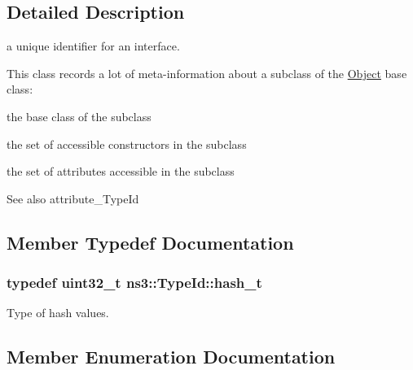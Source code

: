 \subsection{Detailed Description}
a unique identifier for an interface. 

This class records a lot of meta-\/information about a subclass of the \hyperlink{classns3_1_1Object}{Object} base class\+:
\begin{DoxyItemize}
\item the base class of the subclass
\item the set of accessible constructors in the subclass
\item the set of \textquotesingle{}attributes\textquotesingle{} accessible in the subclass
\end{DoxyItemize}

\begin{DoxySeeAlso}{See also}
attribute\+\_\+\+Type\+Id 
\end{DoxySeeAlso}


\subsection{Member Typedef Documentation}
\subsubsection[{\texorpdfstring{hash\+\_\+t}{hash_t}}]{\setlength{\rightskip}{0pt plus 5cm}typedef uint32\+\_\+t {\bf ns3\+::\+Type\+Id\+::hash\+\_\+t}}\hypertarget{classns3_1_1TypeId_ab3fc1475c4a0c2cfb35b976dbd609057}{}\label{classns3_1_1TypeId_ab3fc1475c4a0c2cfb35b976dbd609057}
Type of hash values. 

\subsection{Member Enumeration Documentation}
